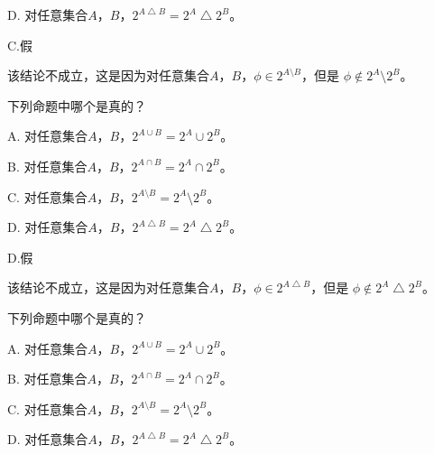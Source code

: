 \documentclass{beamer}
\begin{document}
\begin{CJK*}{UTF8}{gbsn}
\begin{frame}
\begin{Exercise}
D. 对任意集合$A$，$B$，$2^{A\bigtriangleup B} = 2^A \bigtriangleup 2^B$。

\end{Exercise}
\pause
C.假

该结论不成立，这是因为对任意集合$A$，$B$，$\phi \in 2^{A\setminus B}$，但是 $\phi \notin 2^A \setminus 2^B$。

\end{frame}
\begin{frame}
\begin{Exercise}
  下列命题中哪个是真的？

A. 对任意集合$A$，$B$，$2^{A\cup B} = 2^A \cup 2^B$。

B. 对任意集合$A$，$B$，$2^{A\cap B} = 2^A \cap 2^B$。

C. 对任意集合$A$，$B$，$2^{A\setminus B} = 2^A \setminus 2^B$。

D. 对任意集合$A$，$B$，$2^{A\bigtriangleup B} = 2^A \bigtriangleup 2^B$。

\end{Exercise}
\pause
D.假

该结论不成立，这是因为对任意集合$A$，$B$，$\phi \in 2^{A\bigtriangleup B}$，但是 $\phi \notin 2^A \bigtriangleup 2^B$。


\end{frame}

\begin{frame}
\begin{Exercise}
  下列命题中哪个是真的？

A. 对任意集合$A$，$B$，$2^{A\cup B} = 2^A \cup 2^B$。

B. 对任意集合$A$，$B$，$2^{A\cap B} = 2^A \cap 2^B$。

C. 对任意集合$A$，$B$，$2^{A\setminus B} = 2^A \setminus 2^B$。

D. 对任意集合$A$，$B$，$2^{A\bigtriangleup B} = 2^A \bigtriangleup 2^B$。


\end{Exercise}
\end{frame}
\end{CJK*}
\end{document}
